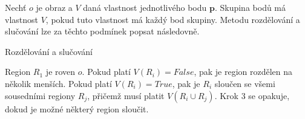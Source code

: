\documentclass[twoside]{ctuthesis}
\newcommand{\tl}[1]{$\mathbf{#1}$}
\begin{document}
    Nechť $o$ je obraz a $V$ daná vlastnost jednotlivého bodu \tl{p}. Skupina bodů má vlastnost $V$, pokud tuto vlastnost má každý bod skupiny. Metodu rozdělování a slučování lze za těchto podmínek popsat následovně.\cite{segmentace_metody}
\begin{algorithm}
    \caption{Rozdělování a slučování}
    \label{alg:Divideandmerge}
    \begin{algorithmic}[1]
        \STATE Region $R_1$ je roven $o$.
        \STATE Pokud platí $V(R_i) = False$, pak je region rozdělen na několik menších.
        \STATE Pokud platí $V(R_i) = True$, pak je $R_i$ sloučen se všemi sousedními regiony $R_j$, přičemž musí platit $V(R_i \cup R_j)$. 
        \STATE Krok 3 se opakuje, dokud je možné některý region sloučit.
    \end{algorithmic}
\end{algorithm}
\end{document}
